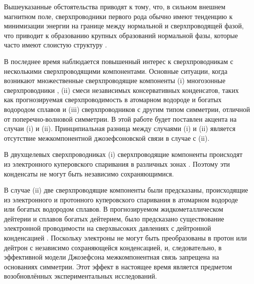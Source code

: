 Вышеуказанные обстоятельства приводят к тому, что, в сильном внешнем магнитном 
поле, сверхпроводники первого рода обычно имеют тенденцию к минимизации 
энергии на границе между нормальной и сверхпроводящей фазой, что приводит к 
образованию крупных образований нормальной фазы, которые часто имеют слоистую 
структуру \cite{bib:4}. 

В последнее время наблюдается повышенный интерес к сверхпроводникам с 
несколькими сверхпроводящими компонентами. Основные ситуации, когда возникают 
множественные сверхпроводящие компоненты (i) многозонные сверхпроводники
\cite{bib:6,bib:7,bib:8,bib:9,bib:10,bib:11}, (ii) смеси независимых 
консервативных конденсатов, таких как прогнозируемая сверхпроводимость в 
атомарном водороде и богатых водородом сплавов 
\cite{bib:12.1,bib:12.2,bib:13,bib:14} и (iii) сверхпроводников с другим типом 
симметрии, отличной от поперечно-волновой симметрии. В этой работе будет 
поставлен акцента на случаи (i) и (ii). Принципиальная разница между случаями 
(i) и (ii) является отсутствие межкомпонентной джозефсоновской связи в случае 
с (ii).

В двухщелевых сверхпроводниках (i) сверхпроводящие компоненты происходят из
электронного куперовского спаривания в различных зонах \cite{bib:6}. Поэтому 
эти конденсаты не могут быть независимо сохраняющимися.

В случае (ii) две сверхпроводящие компоненты были предсказаны, происходящие 
из электронного и протонного куперовского спаривания в атомарном водороде 
или богатых водородом сплавов. В прогнозируемом жидкометаллическом дейтерии и 
сплавов богатых дейтерием, было предсказано существование электронной 
проводимости на сверхвысоких давлениях с дейтронной конденсацией  
\cite{bib:12.1,bib:12.2,bib:13,bib:14}. Поскольку электроны не могут быть 
преобразованы в протон или дейтрон с независимо сохраняющейся конденсацией, и, 
следовательно, в эффективной модели Джозефсона межкомпонентная связь запрещена 
на основаниях симметрии. Этот эффект в настоящее время является предметом 
возобновлённых экспериментальных исследований.

